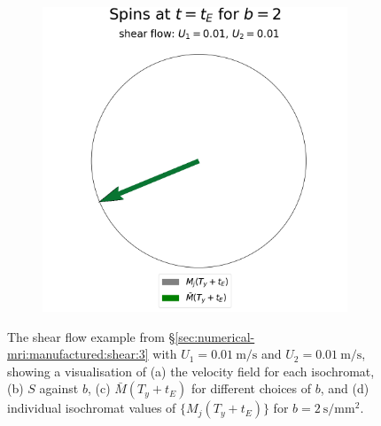 \begin{figure}
\begin{subfigure}{0.4\textwidth}
                        \caption{}
                        \label{fig:mri-shear-3:b}
                    \end{subfigure}
                    \begin{subfigure}{0.4\textwidth}
                        \centering
                        \includegraphics[width=\textwidth]{diagrams/results-mri/simple-tests/mri-spins_avg_2D_shear_test_3.png}
                        \caption{}
                        \label{fig:mri-shear-3:spins}
                    \end{subfigure}
                    \caption{The shear flow example from \S\ref{sec:numerical-mri:manufactured:shear:3} with $U_1 = \qty{0.01}{\metre\per\second}$ and $U_2 = \qty{0.01}{\metre\per\second}$, showing a visualisation of (a) the velocity field for each isochromat, (b) $S$ against $b$, (c) $\bar{M}(T_y + t_E)$ for different choices of $b$, and (d) individual isochromat values of $\{ M_j(T_y + t_E) \}$ for $b=\qty{2}{\second\per\milli\metre^2}$.}
                    \label{fig:mri-shear-3}
                \end{figure}

